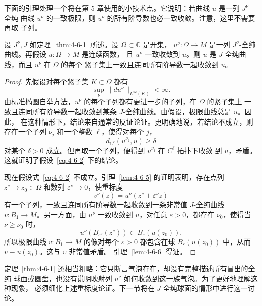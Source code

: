 下面的引理处理一个将在第 5 章使用的小技术点。它说明：若曲线 $u$ 是一列 $J^\nu$-全纯
曲线 $u^\nu$ 的一致极限，则 $u^\nu$ 的所有阶导数也必一致收敛。注意，这里不需要再取
子列。

\begin{lemma}\label{lem:4-6-6}
设 $J^\nu,J$ 如定理~\ref{thm:4-6-1} 所述。设 $\Omega\subset\mathbb C$ 是开集，
$u^\nu:\Omega\to M$ 是一列 $J^\nu$-全纯曲线。再假设 $u:\Omega\to M$ 是连续函数，
且 $u^\nu$ 一致收敛到 $u$。则 $u$ 是 $J$-全纯曲线，而且 $u^\nu$ 在 $\Omega$ 的每个
紧子集上一致且连同所有阶导数一起收敛到 $u$。
\end{lemma}

\begin{proof}
先假设对每个紧子集 $K\subset\Omega$ 都有
\begin{equation}\label{eq:4-6-2}
  \sup_\nu\lVert du^\nu\rVert_{L^\infty(K)}<\infty.
\end{equation}
由标准椭圆自举方法，$u^\nu$ 的每个子列都有更进一步的子列，在 $\Omega$ 的紧子集上
一致且连同所有阶导数一起收敛到某条 $J$-全纯曲线。由假设，极限曲线总是 $u$。因此，
在这种情形下，结论来自通常的反证论证。更明确地说，若结论不成立，则存在一个子列
$\nu_j$ 和一个整数 $\ell$，使得对每个 $j$，
\[
  d_{C^\ell}(u^{\nu_j},u)\ge\delta
\]
对某个 $\delta>0$ 成立。但再取一个子列，便得到 $u^{\nu_j}$ 在 $C^\ell$ 拓扑下收敛
到 $u$，矛盾。这就证明了假设~\eqref{eq:4-6-2} 下的结论。

现在假设式~\eqref{eq:4-6-2} 不成立。引理~\ref{lem:4-6-5} 的证明表明，存在点列
$z^\nu\to z_0\in\Omega$ 和数列 $\varepsilon^\nu\to0$，使重标度
\[
  v^\nu(z)=u^\nu(z^\nu+\varepsilon^\nu z)
\]
有一个子列，一致且连同所有阶导数一起收敛到一条非常值 $J$-全纯曲线
$v:B_1\to M$。另一方面，由 $u^\nu$ 一致收敛到 $u$，对任意 $\varepsilon>0$，都存在
$\nu_0$，使得当 $\nu\ge\nu_0$ 时，
\[
  u^\nu(B_{\varepsilon^\nu}(z^\nu))
  \subset B_\varepsilon(u(z_0)).
\]
所以极限曲线 $v:B_1\to M$ 的像对每个 $\varepsilon>0$ 都包含在球
$B_\varepsilon(u(z_0))$ 中，从而 $v\equiv u(z_0)$。这与 $v$ 非常值矛盾。
引理~\ref{lem:4-6-6} 得证。
\end{proof}

定理~\ref{thm:4-6-1} 还相当粗略：它只断言气泡存在，却没有完整描述所有冒出的全纯
球面或圆盘，也没有说明映射列 $u^\nu$ 如何收敛到这一族气泡。为了更好地理解这种现象，
必须细化上述重标度论证。下一节将在 $J$-全纯球面的情形中进行这一讨论。
